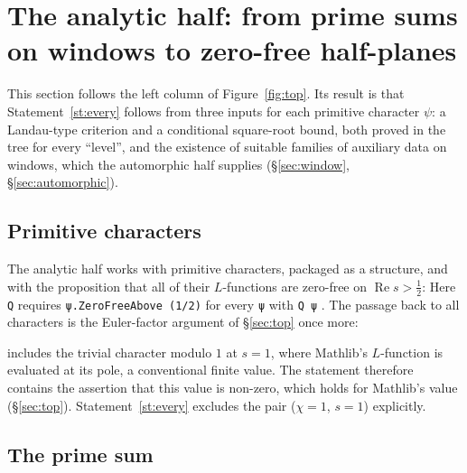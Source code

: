 \section{The analytic half: from prime sums on windows to zero-free half-planes}\label{sec:analytic}

This section follows the left column of Figure~\ref{fig:top}. Its result is that
Statement~\ref{st:every} follows from three inputs for each primitive character $\psi$: a
Landau-type criterion and a conditional square-root bound, both proved in the tree for every
``level'', and the existence of suitable families of auxiliary data on windows, which the
automorphic half supplies (\S\ref{sec:window}, \S\ref{sec:automorphic}).

\subsection{Primitive characters}

The analytic half works with primitive characters, packaged as a structure, and with the
proposition that all of their $L$-functions are zero-free on $\operatorname{Re}s>\frac12$:
\noindent Here  \texttt{Q} requires \texttt{ψ.ZeroFreeAbove (1/2)} for
every \texttt{ψ} with \texttt{Q ψ} .
The passage back to all characters is the Euler-factor argument of \S\ref{sec:top} once more:

\begin{note}
 includes the trivial character modulo $1$ at $s=1$, where Mathlib's
$L$-function is  evaluated at its pole, a conventional finite value. The
statement therefore contains the assertion that this value is non-zero, which holds for Mathlib's
value (\S\ref{sec:top}). Statement~\ref{st:every}
excludes the pair ($\chi=1$, $s=1$) explicitly. \sti
\end{note}

\subsection{The prime sum}

